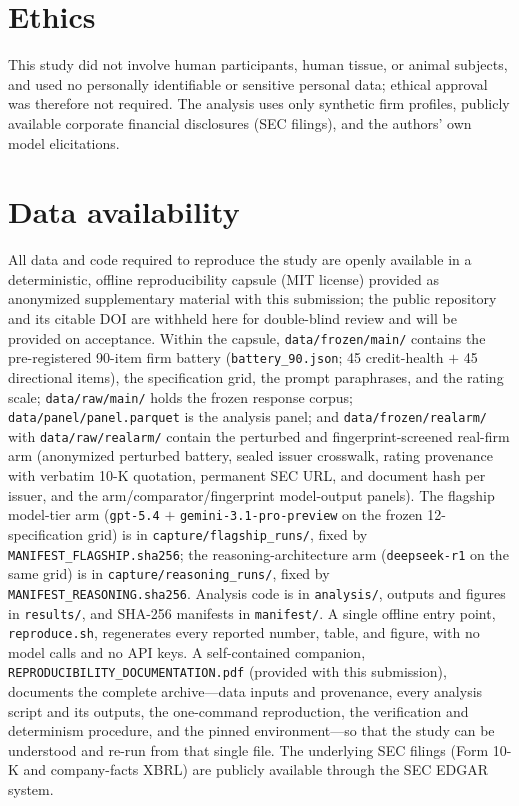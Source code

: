 \documentclass[a4paper,fleqn]{cas-sc}
\begin{document}
\section*{Ethics}
This study did not involve human participants, human tissue, or animal subjects, and used no personally
identifiable or sensitive personal data; ethical approval was therefore not required. The analysis uses
only synthetic firm profiles, publicly available corporate financial disclosures (SEC filings), and the
authors' own model elicitations.

\section*{Data availability}
All data and code required to reproduce the study are openly available in a deterministic, offline
reproducibility capsule (MIT license) provided as anonymized supplementary material with this submission;
the public repository and its citable DOI are withheld here for double-blind review and will be provided
on acceptance.
Within the capsule, \texttt{data/frozen/main/} contains the pre-registered 90-item firm battery
(\texttt{battery\_90.json}; 45 credit-health $+$ 45 directional items), the specification grid, the prompt
paraphrases, and the rating scale; \texttt{data/raw/main/} holds the frozen
response corpus; \texttt{data/panel/panel.parquet} is the analysis panel; and
\texttt{data/frozen/realarm/} with \texttt{data/raw/realarm/} contain the perturbed and fingerprint-screened real-firm arm
(anonymized perturbed battery, sealed issuer crosswalk, rating provenance with verbatim 10-K quotation,
permanent SEC URL, and document hash per issuer, and the arm/comparator/fingerprint model-output panels).
The flagship model-tier arm (\texttt{gpt-5.4} $+$ \texttt{gemini-3.1-pro-preview} on the frozen
12-specification grid) is in \texttt{capture/flagship\_runs/}, fixed by \texttt{MANIFEST\_FLAGSHIP.sha256};
the reasoning-architecture arm (\texttt{deepseek-r1} on the same grid) is in \texttt{capture/reasoning\_runs/},
fixed by \texttt{MANIFEST\_REASONING.sha256}.
Analysis code is in \texttt{analysis/}, outputs and figures in \texttt{results/}, and SHA-256 manifests in
\texttt{manifest/}. A single offline entry point, \texttt{reproduce.sh}, regenerates every reported
number, table, and figure, with no model calls and no API keys. A self-contained companion,
\texttt{REPRODUCIBILITY\_DOCUMENTATION.pdf} (provided with this submission), documents the
complete archive---data inputs and provenance, every analysis script and its outputs, the one-command
reproduction, the verification and determinism procedure, and the pinned environment---so that the study
can be understood and re-run from that single file. The underlying SEC filings (Form 10-K and
company-facts XBRL) are publicly available through the SEC EDGAR system.



\end{document}
